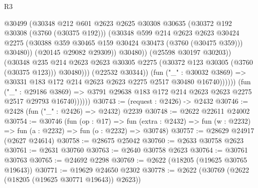\begin{lexlean}{R3}
\begin{coremodule}
                                      @30499
                                      (@30348
                                        @212
                                        @601
                                        @2623
                                        @2625
                                        @30308
                                        @30635
                                        (@30372 @192 @30308 (@3760 (@30375 @192)))
                                        (@30348
                                          @599
                                          @214
                                          @2623
                                          @2623
                                          @30424
                                          @2275
                                          (@30388
                                            @359
                                            @30465
                                            @159
                                            @30424
                                            @30473
                                            (@3760 (@30475 @359)))
                                          @30480))
                                      (@20145 @29082 @29309))
                                    @30480))
                                (@25598 @30197 @30203))
                              (@30348
                                @235
                                @214
                                @2623
                                @2623
                                @30305
                                @2275
                                (@30372 @123 @30305 (@3760 (@30375 @123)))
                                @30480)))
                          (@22532 @30344))
                        (fun ("_" : @30032 @3869) =>
                        @30331 @183 @172 @214 @2623 @2623 @2275 @2517 @30480 @16740))))))
              (fun ("_" : @29186 @3869) =>
              @3791 @29638 @183 @172 @214 @2623 @2623 @2275 @2517 @29793 @16740))))))
@30743 := (request : @2426) -> @2432
@30746 := @2428 (fun ("_" : @2426) => @2432) @2239
@30748 := @2622 @22611 @24002
@30754 := @30746
    (fun (op : @17) =>
    fun (extra : @2432) => fun (w : @2232) => fun (a : @2232) => fun (o : @2232) => @30748)
@30757 := @28629 @24917 (@2627 @24614)
@30758 := @28675 @25042
@30760 := @2633 @30758 @2623
@30761 := @2631 @30760
@30763 := @2640 @30758 @2623
@30764 := @30761 @30763
@30765 := @24692 @2298
@30769 := @2622 (@18205 (@19625 @30765 @19643))
@30771 := @19629 @24650 @2302
@30778 := @2622 (@30769 (@2622 (@18205 (@19625 @30771 @19643)) @2623))

\end{coremodule}
\end{lexlean}

